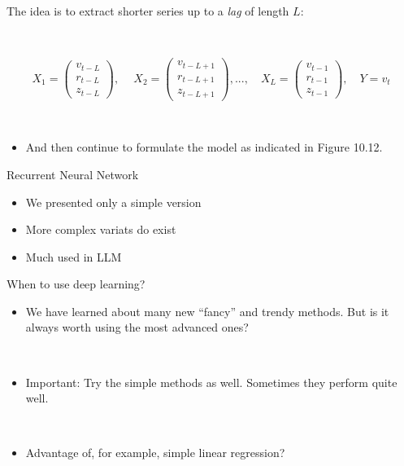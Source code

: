 \documentclass[
  10pt,
  ignorenonframetext,
  twocolumn]{beamer}
\providecommand{\tightlist}{%
  \setlength{\itemsep}{0pt}\setlength{\parskip}{0pt}}
\begin{document}
\begin{frame}
The idea is to extract shorter series up to a \emph{lag} of length
\(L\):

\(~\)

\[X_1 = \left( 
\begin{matrix}
v_{t-L}\\
r_{t-L}\\
z_{t-L}
\end{matrix}
\right), \ 
\quad X_2 = \left( 
\begin{matrix}
v_{t-L+1}\\
r_{t-L+1}\\
z_{t-L+1}
\end{matrix}
\right), ... ,
\quad 
X_L = \left( 
\begin{matrix}
v_{t-1}\\
r_{t-1}\\
z_{t-1}
\end{matrix}
\right), 
\quad 
Y = v_t\]

\(~\)

\begin{itemize}
\tightlist
\item
  And then continue to formulate the model as indicated in Figure 10.12.
\end{itemize}
\end{frame}

\begin{frame}{Recurrent Neural Network}
\label{recurrent-neural-network}
\begin{itemize}
\tightlist
\item
  We presented only a simple version
\item
  More complex variats do exist
\item
  Much used in LLM
\end{itemize}
\end{frame}

\begin{frame}{When to use deep learning?}
\label{when-to-use-deep-learning}
\(~\)

\begin{itemize}
\tightlist
\item
  We have learned about many new ``fancy'' and trendy methods. But is it
  always worth using the most advanced ones?
\end{itemize}

\(~\)

\begin{itemize}
\tightlist
\item
  Important: Try the simple methods as well. Sometimes they perform
  quite well.
\end{itemize}

\(~\)

\begin{itemize}
\tightlist
\item
  Advantage of, for example, simple linear regression?
\end{itemize}
\end{frame}
\end{document}
